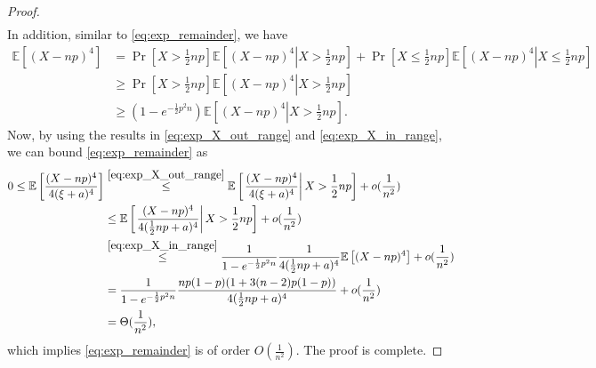 \documentclass[onecolumn,romanappendices,10pt]{IEEEtran}
\newcommand{\EE}{{\mathbb{E}}}
\begin{document}
\begin{proof}
\begin{equation}
\begin{aligned}
			\end{aligned}\label{eq:exp_X_out_range}
		\end{equation}
		In addition, similar to \eqref{eq:exp_remainder}, we have
		\begin{equation}
			\begin{aligned}
				\EE \left[ (X - np)^4 \right] &= \Pr\left[ X > \frac{1}{2} np \right] \EE \left[ \left. (X - np)^4 \right| X > \frac{1}{2}np \right] + \Pr\left[ X \leq \frac{1}{2} np \right] \EE \left[ \left. (X - np)^4 \right| X \leq \frac{1}{2}np \right] \\
				&\geq \Pr\left[ X > \frac{1}{2} np \right] \EE \left[ \left. (X - np)^4 \right| X > \frac{1}{2}np \right] \\
				&\geq \left( 1 - e^{-\frac{1}{2} p^2 n} \right) \EE \left[ \left. (X - np)^4 \right| X > \frac{1}{2}np \right].
			\end{aligned}\label{eq:exp_X_in_range}
		\end{equation}
		Now, by using the results in \eqref{eq:exp_X_out_range} and \eqref{eq:exp_X_in_range}, we can bound \eqref{eq:exp_remainder} as
		\begin{equation}
			\begin{aligned}
				0 \leq \EE \left[ \frac{(X - np)^4}{4 (\xi + a)^4} \right] &\overset{\eqref{eq:exp_X_out_range}}{\leq} \EE \left[ \left. \frac{(X - np)^4}{4 (\xi + a)^4} \right| X > \frac{1}{2}np \right] + o(\frac{1}{n^2}) \\
				&\leq \EE \left[ \left. \frac{(X - np)^4}{4 (\frac{1}{2}np + a)^4} \right| X > \frac{1}{2}np \right] + o(\frac{1}{n^2}) \\
				&\overset{\eqref{eq:exp_X_in_range}}{\leq} \frac{1}{1 - e^{-\frac{1}{2} p^2 n}} \frac{1}{4 (\frac{1}{2}np + a)^4} \EE \left[ (X - np)^4 \right] + o(\frac{1}{n^2}) \\
				&= \frac{1}{1 - e^{-\frac{1}{2} p^2 n}} \frac{np(1-p)(1+ 3(n-2)p(1-p))}{4 (\frac{1}{2}np + a)^4} + o(\frac{1}{n^2}) \\
				&= \Theta(\frac{1}{n^2}),
			\end{aligned}
		\end{equation}
		which implies \eqref{eq:exp_remainder} is of order $O(\frac{1}{n^2})$. The proof is complete.
	\end{proof}
	
\end{document}

